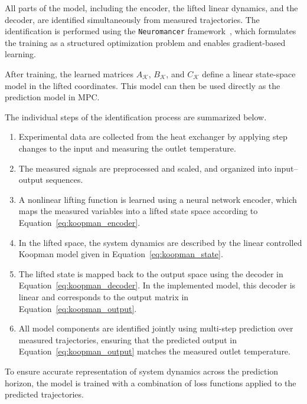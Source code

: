 \FloatBarrier

All parts of the model, including the encoder, the lifted linear dynamics, and the decoder, are identified simultaneously from measured trajectories. The identification is performed using the \texttt{Neuromancer} framework~\cite{neuromancer2022}, which formulates the training as a structured optimization problem and enables gradient-based learning.

After training, the learned matrices $A_{\mathcal K}$, $B_{\mathcal K}$, and $C_{\mathcal K}$ define a linear state-space model in the lifted coordinates. This model can then be used directly as the prediction model in MPC.

The individual steps of the identification process are summarized below.

\begin{enumerate}
    \item Experimental data are collected from the heat exchanger by applying step changes to the input and measuring the outlet temperature.

    \item The measured signals are preprocessed and scaled, and organized into input--output sequences.

    \item A nonlinear lifting function is learned using a neural network encoder, which maps the measured variables into a lifted state space according to Equation~\eqref{eq:koopman_encoder}.

    \item In the lifted space, the system dynamics are described by the linear controlled Koopman model given in Equation~\eqref{eq:koopman_state}.


    \item The lifted state is mapped back to the output space using the decoder in Equation~\eqref{eq:koopman_decoder}. In the implemented model, this decoder is linear and corresponds to the output matrix in Equation~\eqref{eq:koopman_output}.


    \item All model components are identified jointly using multi-step prediction over measured trajectories, ensuring that the predicted output in Equation~\eqref{eq:koopman_output} matches the measured outlet temperature.


\end{enumerate}

To ensure accurate representation of system dynamics across the prediction horizon, the model is trained with a combination of loss functions applied to the predicted trajectories.

